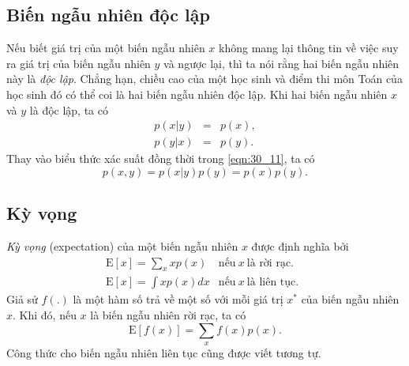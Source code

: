 


\subsection{Biến ngẫu nhiên độc lập}
Nếu biết giá trị của một biến ngẫu nhiên $x$ không mang lại thông tin về việc
suy ra giá trị của biến ngẫu nhiên $y$ và ngược lại, thì ta nói rằng hai biến
ngẫu nhiên này là \textit{độc lập}. Chẳng hạn, chiều cao của một học sinh và
điểm thi môn Toán của học sinh đó có thể coi là hai biến ngẫu nhiên {độc lập}.
Khi hai biến ngẫu nhiên $x$ và $y$ là {độc lập}, ta  có%
\begin{eqnarray}
\label{eqn:30_18}
p(x | y) &=& p(x),  \\
\label{eqn:30_19}
p(y | x) &=& p(y).
\end{eqnarray}
Thay vào biểu thức xác suất đồng thời trong \eqref{eqn:30_11}, ta có
\begin{equation}
\label{eqn:30_20}
p(x, y) = p(x | y) p(y) = p(x) p(y).
\end{equation}


\subsection{Kỳ vọng}
\label{sub:expectaion_covariance}
\textit{Kỳ vọng} (expectation) của một biến ngẫu nhiên $x$ được định nghĩa bởi%
\begin{eqnarray}
\label{eqn:30_21}
\text{E}[x] = \sum_x x p(x)  & \text{nếu}~ x ~ \text{là rời rạc.} \quad
\\
\label{eqn:30_22}
\text{E}[x] = \int x p(x) dx  & \text{nếu}~ x ~ \text{là liên tục.}
\end{eqnarray}
Giả sử $f(.)$ là một hàm số trả về một số với mỗi giá trị $x^*$ của biến ngẫu
nhiên $x$. Khi đó, nếu $x$ là biến ngẫu nhiên rời rạc, ta có
\begin{equation}
\label{eqn:30_23}
\text{E}[f(x)] = \sum_x f(x) p(x).
\end{equation}
Công thức cho biến ngẫu nhiên liên tục cũng được viết tương tự.

